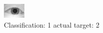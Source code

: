 \begin{figure}[h!]
\begin{center}
\includegraphics[width=0.60\columnwidth]{figures/ID932_class_1_target_2.png}
\end{center}
\caption{ Classification: 1 actual target: 2}
\label{fig:ID932_class_1_target_2}
\end{figure}
